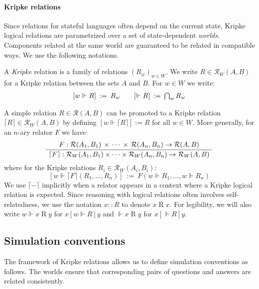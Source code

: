 \documentclass[acmsmall,screen,review,anonymous]{acmart}
\newcommand{\ifr}[1]{\mathrel{[{#1}]}}
\begin{document}
\paragraph{Kripke relations}

Since relations for stateful languages
often depend on the current state,
Kripke logical relations
are parametrized over a set of state-dependent \emph{worlds}.
Components related at the same world
are guaranteed to be related in compatible ways.
We use the following notations.

\begin{definition} \label{def:klr} %
A \emph{Kripke} relation is
a family of relations $(R_w)_{w \in W}$.
We write $R \in \mathcal{R}_W(A, B)$
for a Kripke relation between the sets $A$ and $B$.
For $w \in W$ we write:
\[
\begin{array}{c@{\qquad}c}
    [w \Vdash R] \: := \: R_w &
    [\Vdash R] \: := \: \bigcap_{w} R_w
\end{array}
\]
\end{definition}

A simple relation $R \in \mathcal{R}(A, B)$
can be promoted to a Kripke relation
$\lceil R \rceil \in \mathcal{R}_W(A, B)$
by defining $[w \Vdash \lceil R \rceil] := R$ for all $w \in W$.
More generally, for an $n$-ary relator $F$ we have:
\[
  \AxiomC{$
    F :
      \mathcal{R}(A_1, B_1) \,\times\,\cdots\,\times\,\mathcal{R}(A_n, B_n)
      \rightarrow \mathcal{R}(A, B)$}
  \UnaryInfC{$
    \lceil F \rceil :
      \mathcal{R}_W(A_1, B_1) \times \cdots \times \mathcal{R}_W(A_n, B_n)
      \rightarrow \mathcal{R}_W(A, B)$}
  \DisplayProof
\]
where for the Kripke relations $R_i \in \mathcal{R}_W(A_i, B_i)$:
\[
  [w \Vdash \lceil F \rceil (R_1, \ldots, R_n)] \: := \:
    F(w \Vdash R_1, \ldots, w \Vdash R_n)
\]
We use $\lceil - \rceil$ implicitly
when a relator appears in a context where
a Kripke logical relation is expected.
Since reasoning with logical relations
often involves self-relatedness,
we use the notation
$x :: R$ to denote $x \mathrel{R} x$.
For legibility, we will also write
$w \Vdash x \mathrel{R} y$ for $x \ifr{w \Vdash R} y$
and $\Vdash x \mathrel{R} y$ for $x \ifr{\Vdash R} y$.


\subsection{Simulation conventions} \label{sec:simconv} %

The framework of Kripke relations allows us
to define simulation conventions as follows.
The worlds ensure that corresponding pairs of
questions and answers are related consistently.
\end{document}
